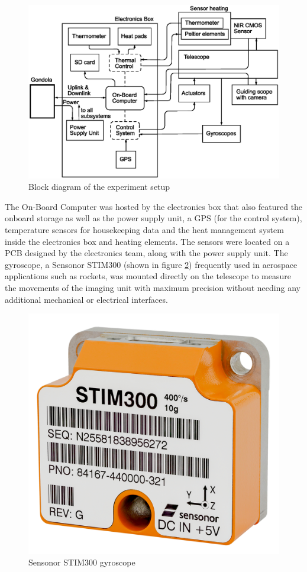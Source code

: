 \begin{figure}[htb]
	\centering
	\includegraphics[width = \linewidth]{4-experiment-design/img/setup/Block_diagram_4-1}
	\caption{Block diagram of the experiment setup}
	\label{fig::4-1_block_diagram}
\end{figure}

The On-Board Computer was hosted by the electronics box that also featured the onboard storage as well as the power supply unit, a GPS (for the control system), temperature sensors for housekeeping data and the heat management system inside the electronics box and heating elements. The sensors were located on a PCB designed by the electronics team, along with the power supply unit.
The gyroscope, a Sensonor STIM300 (shown in figure \mbox{\ref{fig::4-1_stim300}}) frequently used in aerospace applications such as rockets, was mounted directly on the telescope to measure the movements of the imaging unit with maximum precision without needing any additional mechanical or electrical interfaces.
\begin{figure}[htb]
	\centering
	\includegraphics[width = 0.25\linewidth]{4-experiment-design/img/setup/sensonor-stim-300}
	\caption{Sensonor STIM300 gyroscope}
	\label{fig::4-1_stim300}
\end{figure}


